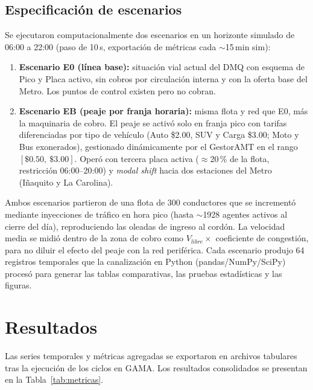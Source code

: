 \documentclass[twocolumn,10pt]{article}
\begin{document}
\subsection{Especificaci\'on de escenarios}
Se ejecutaron computacionalmente dos escenarios en un horizonte simulado de 06:00 a 22:00
(paso de 10\,s, exportaci\'on de m\'etricas cada $\sim$15\,min sim):
\begin{enumerate}[leftmargin=1.4em,itemsep=2pt,topsep=2pt]
  \item \textbf{Escenario E0 (l\'inea base):} situaci\'on vial actual del DMQ con esquema
        de Pico y Placa activo, sin cobros por circulaci\'on interna y con la oferta base
        del Metro. Los puntos de control existen pero no cobran.
  \item \textbf{Escenario EB (peaje por franja horaria):} misma flota y red que E0, m\'as
        la maquinaria de cobro. El peaje se activ\'o solo en franja pico con tarifas
        diferenciadas por tipo de veh\'iculo (Auto \$2.00, SUV y Carga \$3.00; Moto y Bus
        exonerados), gestionado din\'amicamente por el GestorAMT en el rango
        $[\$0.50,\ \$3.00]$. Oper\'o con tercera placa activa ($\approx$20\,\% de la flota,
        restricci\'on 06:00--20:00) y \textit{modal shift} hacia dos estaciones del Metro
        (I\~naquito y La Carolina).
\end{enumerate}

Ambos escenarios partieron de una flota de 300 conductores que se increment\'o mediante
inyecciones de tr\'afico en hora pico (hasta $\sim$1928 agentes activos al cierre del
d\'ia), reproduciendo las oleadas de ingreso al cord\'on. La velocidad media se midi\'o
dentro de la zona de cobro como $V_{libre}\times$ coeficiente de congesti\'on, para no
diluir el efecto del peaje con la red perif\'erica. Cada escenario produjo 64 registros
temporales que la canalizaci\'on en Python (pandas/NumPy/SciPy) proces\'o para generar las
tablas comparativas, las pruebas estad\'isticas y las figuras.

\section{Resultados}
Las series temporales y m\'etricas agregadas se exportaron en archivos tabulares tras la
ejecuci\'on de los ciclos en GAMA. Los resultados consolidados se presentan en la
Tabla~\ref{tab:metricas}.
\end{document}
